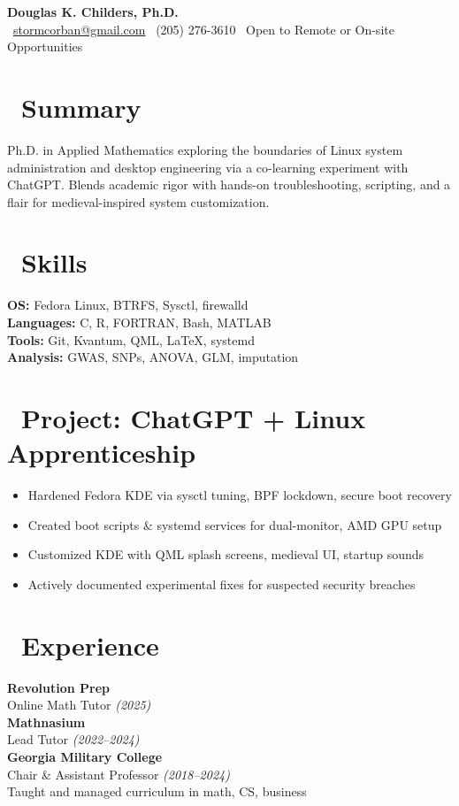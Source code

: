 \documentclass[a4paper,10pt]{article}
\begin{document}
\begin{center}
    {\Huge \textbf{Douglas K. Childers, Ph.D.}}\\[2pt]
    \faEnvelope\ \href{mailto:stormcorban@gmail.com}{stormcorban@gmail.com} \quad
    \faPhone\ (205) 276-3610 \quad
    \faMapMarker*\ Open to Remote or On-site Opportunities
\end{center}

\vspace{0.5cm}

\begin{multicols}{2}
\section*{\faUser\ Summary}
Ph.D. in Applied Mathematics exploring the boundaries of Linux system administration and desktop engineering via a co-learning experiment with ChatGPT. Blends academic rigor with hands-on troubleshooting, scripting, and a flair for medieval-inspired system customization.

\section*{\faCogs\ Skills}
\textbf{OS:} Fedora Linux, BTRFS, Sysctl, firewalld\\
\textbf{Languages:} C, R, FORTRAN, Bash, MATLAB\\
\textbf{Tools:} Git, Kvantum, QML, LaTeX, systemd\\
\textbf{Analysis:} GWAS, SNPs, ANOVA, GLM, imputation

\section*{\faFlask\ Project: ChatGPT + Linux Apprenticeship}
\begin{itemize}[leftmargin=*]
    \item Hardened Fedora KDE via sysctl tuning, BPF lockdown, secure boot recovery
    \item Created boot scripts \& systemd services for dual-monitor, AMD GPU setup
    \item Customized KDE with QML splash screens, medieval UI, startup sounds
    \item Actively documented experimental fixes for suspected security breaches
\end{itemize}

\section*{\faBriefcase\ Experience}
\textbf{Revolution Prep}\\
Online Math Tutor \textit{(2025)}\\
\textbf{Mathnasium}\\
Lead Tutor \textit{(2022–2024)}\\
\textbf{Georgia Military College}\\
Chair \& Assistant Professor \textit{(2018–2024)}\\
Taught and managed curriculum in math, CS, business


\end{multicols}
\end{document}
